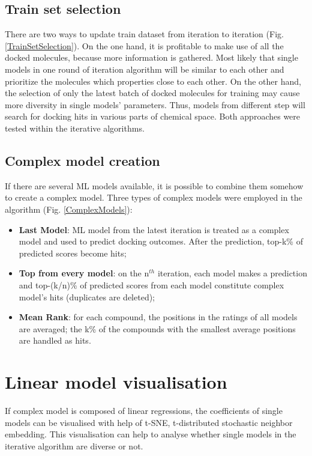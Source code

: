 \subsection{Train set selection}
There are two ways to update train dataset from iteration to iteration (Fig. \ref{TrainSetSelection}).
On the one hand, it is profitable to make use of all the docked molecules, because more information is gathered.
Most likely that single models in one round of iteration algorithm will be similar to each other and prioritize the molecules which properties close to each other.
On the other hand, the selection of only the latest batch of docked molecules for training may cause more diversity in single models' parameters.
Thus, models from different step will search for docking hits in various parts of chemical space.
Both approaches were tested within the iterative algorithms.\\

\subsection{Complex model creation}

If there are several ML models available, it is possible to combine them somehow to create a complex model.
Three types of complex models were employed in the algorithm (Fig. \ref{ComplexModels}):
\begin{itemize}
    \item \textbf{Last Model}: ML model from the latest iteration is treated as a complex model and used to predict docking outcomes.
    After the prediction, top-k\% of predicted scores become hits;
    \item \textbf{Top from every model}: on the $\text{n}^{th}$ iteration, each model makes a prediction and top-(k/n)\% of predicted scores from each model constitute complex model's hits (duplicates are deleted);
    \item \textbf{Mean Rank}: for each compound, the positions in the ratings of all models are averaged; the k\% of the compounds with the smallest average positions are handled as hits.
\end{itemize}

\section{Linear model visualisation}
If complex model is composed of linear regressions, the coefficients of single models can be visualised with help of t-SNE, t-distributed stochastic neighbor embedding.
This visualisation can help to analyse whether single models in the iterative algorithm are diverse or not. \\

